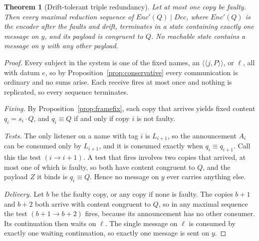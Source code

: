 \documentclass[11pt]{article}
\newtheorem{theorem}{Theorem}[section]
\theoremstyle{definition}
\theoremstyle{remark}
\newcommand{\act}[2]{#1\cdot #2}
\newcommand{\scong}{\equiv}
\begin{document}
\begin{theorem}[Drift-tolerant triple redundancy]\label{thm:tmr}
Let at most one copy be faulty. Then every maximal reduction sequence of
$\mathit{Enc}'(Q)\mid\mathit{Dec}$, where $\mathit{Enc}'(Q)$ is the encoder
after the faults and drift, terminates in a state containing exactly one
message on $y$, and its payload is congruent to $Q$. No reachable state
contains a message on $y$ with any other payload.
\end{theorem}

\begin{proof}
Every subject in the system is one of the fixed names, an
$\langle\!\langle j,P\rangle\!\rangle$, or $\ell$, all with datum $e$, so by
Proposition~\ref{prop:conservative} every communication is ordinary and no
sums arise. Each receive fires at most once and nothing is replicated, so
every sequence terminates.

\emph{Fixing.} By Proposition~\ref{prop:framefix}, each copy that arrives
yields fixed content $q_i=\act{s_i}{Q}$, and $q_i\scong Q$ if and only if
copy $i$ is not faulty.

\emph{Tests.} The only listener on a name with tag $i$ is $L_{i+1}$, so the
announcement $A_i$ can be consumed only by $L_{i+1}$, and it is consumed
exactly when $q_i\scong q_{i+1}$. Call this the test $(i\to i+1)$. A test that
fires involves two copies that arrived, at most one of which is faulty, so
both have content congruent to $Q$, and the payload $Z$ it binds is
$q_i\scong Q$. Hence no message on $y$ ever carries anything else.

\emph{Delivery.} Let $b$ be the faulty copy, or any copy if none is faulty.
The copies $b+1$ and $b+2$ both arrive with content congruent to $Q$, so in
any maximal sequence the test $(b+1\to b+2)$ fires, because its announcement
has no other consumer. Its continuation then waits on $\ell$. The single
message on $\ell$ is consumed by exactly one waiting continuation, so exactly
one message is sent on $y$.
\end{proof}
\end{document}
